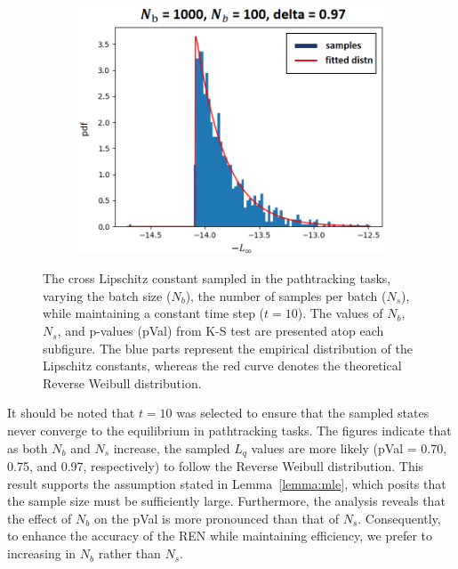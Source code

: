 \documentclass[conference]{IEEEtran}
\newcommand{\ren}{\textsc{REN}\xspace}
\begin{document}
\begin{figure}[htbp]
  \begin{subfigure}[b]{0.15\textwidth}
    \includegraphics[width=\textwidth]
    {figures/experiment 1/pathtracking/pathtrack 1000x100 10step}
    \caption{}
  \end{subfigure}
  \caption{
  The cross Lipschitz constant sampled in the 
  pathtracking tasks, varying the batch size 
  ($N_b$), the number of samples per batch ($N_s$), 
  while maintaining a constant time step ($t = 10$). 
  The values of $N_b$, $N_s$, and p-values 
  (pVal) from K-S test 
  are presented atop each 
  subfigure. The blue parts represent 
  the empirical distribution of the Lipschitz 
  constants, whereas the red curve denotes the 
  theoretical Reverse Weibull distribution.  
  }
  \label{fig:experiment1.1}
\end{figure}


It should be noted that $t = 10$ was selected 
to ensure that the sampled states never 
converge to the equilibrium in pathtracking tasks. 
The figures indicate that as both 
$N_b$ and $N_s$ increase, the sampled $L_q$ values 
are more likely (pVal = 0.70, 0.75, and 0.97, 
respectively) to follow the Reverse 
Weibull distribution. 
This result supports 
the assumption stated in 
Lemma~\ref{lemma:mle}, which posits that 
the sample size must be sufficiently large. 
Furthermore, the analysis reveals that 
the effect of $N_b$ on the pVal is more 
pronounced than that of $N_s$. 
Consequently, to enhance the accuracy of 
the \ren while maintaining efficiency, we 
prefer to increasing in $N_b$ rather than $N_s$.
\end{document}
